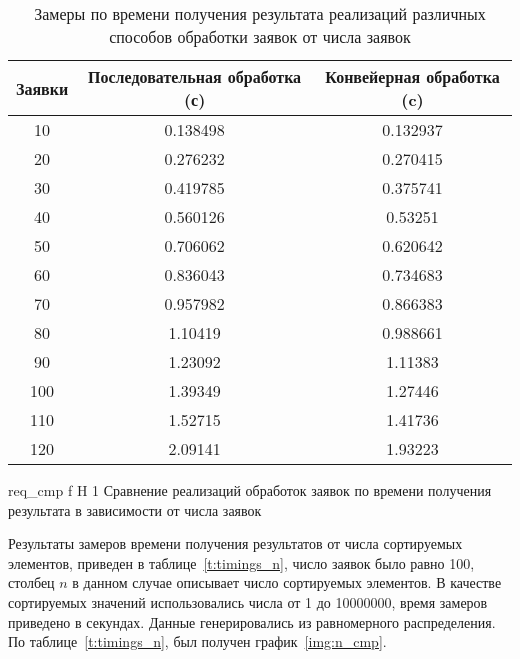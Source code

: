 \begin{table}[H]
	\centering
	\caption{Замеры по времени получения результата реализаций различных способов обработки заявок от числа заявок}
	\begin{tabular}{|c|c|c|}
		\hline
		Заявки & Последовательная обработка (с) & Конвейерная обработка (c) \\ \hline
		10     & 0.138498                       & 0.132937              \\ \hline
		20     & 0.276232                       & 0.270415              \\ \hline
		30     & 0.419785                       & 0.375741              \\ \hline
		40     & 0.560126                       & 0.53251               \\ \hline
		50     & 0.706062                       & 0.620642              \\ \hline
		60     & 0.836043                       & 0.734683              \\ \hline
		70     & 0.957982                       & 0.866383              \\ \hline
		80     & 1.10419                        & 0.988661              \\ \hline
		90     & 1.23092                        & 1.11383               \\ \hline
		100    & 1.39349                        & 1.27446               \\ \hline
		110    & 1.52715                        & 1.41736               \\ \hline
		120    & 2.09141                        & 1.93223               \\ \hline
	\end{tabular}
	\label{t:timings_req}
\end{table}

{req_cmp} %
{f} %
{H} %
{1\textwidth} %
{Сравнение реализаций обработок заявок по времени получения результата в зависимости от числа заявок} %

Результаты замеров времени получения результатов от числа сортируемых элементов, приведен в таблице~\ref{t:timings_n}, число заявок было равно 100, столбец $n$ в данном случае описывает число сортируемых элементов.
В качестве сортируемых значений использовались  числа от 1 до 10000000, время замеров приведено в секундах.
Данные генерировались из равномерного распределения.
По таблице~\ref{t:timings_n}, был получен график~\ref{img:n_cmp}.

